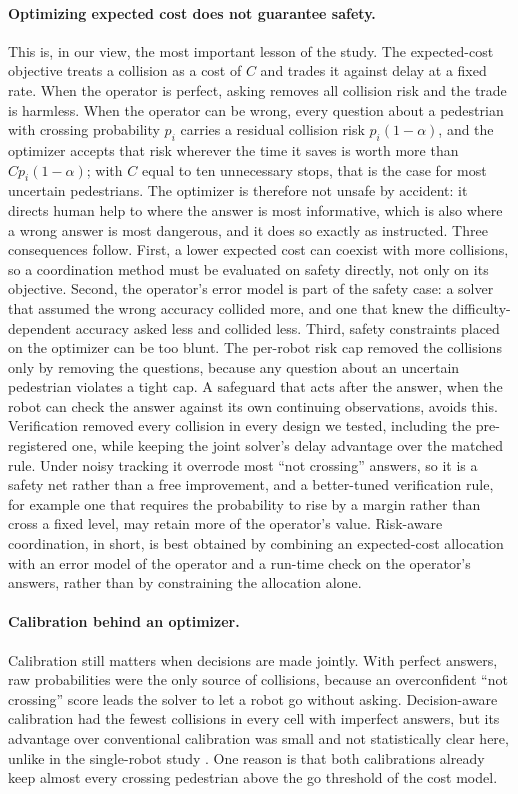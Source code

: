 \documentclass[a4paper,fleqn]{cas-dc}
\begin{document}
\paragraph{Optimizing expected cost does not guarantee safety.} This is, in our view, the most important lesson of the study. The expected-cost objective treats a collision as a cost of $C$ and trades it against delay at a fixed rate. When the operator is perfect, asking removes all collision risk and the trade is harmless. When the operator can be wrong, every question about a pedestrian with crossing probability $p_i$ carries a residual collision risk $p_i(1-\alpha)$, and the optimizer accepts that risk wherever the time it saves is worth more than $C p_i (1-\alpha)$; with $C$ equal to ten unnecessary stops, that is the case for most uncertain pedestrians. The optimizer is therefore not unsafe by accident: it directs human help to where the answer is most informative, which is also where a wrong answer is most dangerous, and it does so exactly as instructed. Three consequences follow. First, a lower expected cost can coexist with more collisions, so a coordination method must be evaluated on safety directly, not only on its objective. Second, the operator's error model is part of the safety case: a solver that assumed the wrong accuracy collided more, and one that knew the difficulty-dependent accuracy asked less and collided less. Third, safety constraints placed on the optimizer can be too blunt. The per-robot risk cap removed the collisions only by removing the questions, because any question about an uncertain pedestrian violates a tight cap. A safeguard that acts after the answer, when the robot can check the answer against its own continuing observations, avoids this. Verification removed every collision in every design we tested, including the pre-registered one, while keeping the joint solver's delay advantage over the matched rule. Under noisy tracking it overrode most ``not crossing'' answers, so it is a safety net rather than a free improvement, and a better-tuned verification rule, for example one that requires the probability to rise by a margin rather than cross a fixed level, may retain more of the operator's value. Risk-aware coordination, in short, is best obtained by combining an expected-cost allocation with an error model of the operator and a run-time check on the operator's answers, rather than by constraining the allocation alone.

\paragraph{Calibration behind an optimizer.} Calibration still matters when decisions are made jointly. With perfect answers, raw probabilities were the only source of collisions, because an overconfident ``not crossing'' score leads the solver to let a robot go without asking. Decision-aware calibration had the fewest collisions in every cell with imperfect answers, but its advantage over conventional calibration was small and not statistically clear here, unlike in the single-robot study \citep{udekwe2026askoract}. One reason is that both calibrations already keep almost every crossing pedestrian above the go threshold of the cost model.
\end{document}
